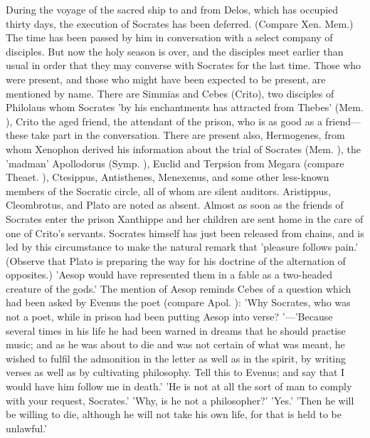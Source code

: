 \documentclass[11pt,letter]{article}
\begin{document}
\par  During the voyage of the sacred ship to and from Delos, which has occupied thirty days, the execution of Socrates has been deferred. (Compare Xen. Mem.) The time has been passed by him in conversation with a select company of disciples. But now the holy season is over, and the disciples meet earlier than usual in order that they may converse with Socrates for the last time. Those who were present, and those who might have been expected to be present, are mentioned by name. There are Simmias and Cebes (Crito), two disciples of Philolaus whom Socrates 'by his enchantments has attracted from Thebes' (Mem. ), Crito the aged friend, the attendant of the prison, who is as good as a friend—these take part in the conversation. There are present also, Hermogenes, from whom Xenophon derived his information about the trial of Socrates (Mem. ), the 'madman' Apollodorus (Symp. ), Euclid and Terpsion from Megara (compare Theaet. ), Ctesippus, Antisthenes, Menexenus, and some other less-known members of the Socratic circle, all of whom are silent auditors. Aristippus, Cleombrotus, and Plato are noted as absent. Almost as soon as the friends of Socrates enter the prison Xanthippe and her children are sent home in the care of one of Crito's servants. Socrates himself has just been released from chains, and is led by this circumstance to make the natural remark that 'pleasure follows pain.' (Observe that Plato is preparing the way for his doctrine of the alternation of opposites.) 'Aesop would have represented them in a fable as a two-headed creature of the gods.' The mention of Aesop reminds Cebes of a question which had been asked by Evenus the poet (compare Apol. ): 'Why Socrates, who was not a poet, while in prison had been putting Aesop into verse? '—'Because several times in his life he had been warned in dreams that he should practise music; and as he was about to die and was not certain of what was meant, he wished to fulfil the admonition in the letter as well as in the spirit, by writing verses as well as by cultivating philosophy. Tell this to Evenus; and say that I would have him follow me in death.' 'He is not at all the sort of man to comply with your request, Socrates.' 'Why, is he not a philosopher?' 'Yes.' 'Then he will be willing to die, although he will not take his own life, for that is held to be unlawful.'
\end{document}
